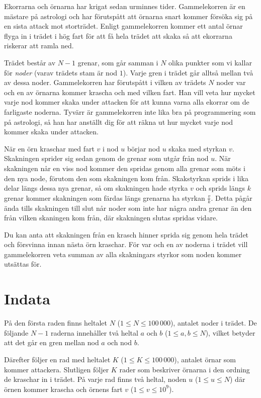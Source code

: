 Ekorrarna och örnarna har krigat sedan urminnes tider.
Gammelekorren är en mästare på astrologi och har förutspått att örnarna snart kommer försöka sig på en sista attack mot storträdet.
Enligt gammelekorren kommer ett antal örnar flyga in i trädet i hög fart för att få hela trädet att skaka så att ekorrarna riskerar att ramla ned.

Trädet består av $N - 1$ grenar, som går samman i $N$ olika punkter som vi kallar för \emph{noder} (varav trädets stam är nod $1$).
Varje gren i trädet går alltså mellan två av dessa noder.
Gammelekorren har förutspått i vilken av trädets $N$ noder var och en av örnarna kommer krascha och med vilken fart.
Han vill veta hur mycket varje nod kommer skaka under attacken för att kunna varna alla ekorrar om de farligaste noderna.
Tyvärr är gammelekorren inte lika bra på programmering som på astrologi, så han har anställt dig för att räkna ut hur mycket varje nod kommer skaka under attacken.

När en örn kraschar med fart $v$ i nod $u$ börjar nod $u$ skaka med styrkan $v$.
Skakningen sprider sig sedan genom de grenar som utgår från nod $u$.
När skakningen når en viss nod kommer den spridas genom alla grenar som möts i den nya node, förutom den som skakningen kom från.
Skakstyrkan sprids i lika delar längs dessa nya grenar, så om skakningen hade styrka $v$ och sprids längs $k$ grenar kommer skakningen som färdas längs grenarna ha styrkan $\frac{v}{k}$.
Detta pågår ända tills skakningen till slut når noder som inte har några andra grenar än den från vilken skaningen kom från, där skakningen slutas spridas vidare.

Du kan anta att skakningen från en krasch hinner sprida sig genom hela trädet och försvinna innan nästa örn kraschar.
För var och en av noderna i trädet vill gammelekorren veta summan av alla skakningars styrkor som noden kommer utsättas för.

\section*{Indata}
På den första raden finns heltalet $N$ ($1 \le N \le 100\,000$), antalet noder i trädet.
De följande $N-1$ raderna innehåller två heltal $a$ och $b$ ($1 \le a,b \le N$), vilket betyder att det går en gren mellan nod $a$ och nod $b$.

Därefter följer en rad med heltalet $K$ ($1 \le K \le 100\,000$), antalet örnar som kommer attackera.
Slutligen följer $K$ rader som beskriver örnarna i den ordning de kraschar in i trädet.
På varje rad finns två heltal, noden $u$ ($1 \le u \le N$) där örnen kommer krascha och örnens fart $v$ ($1 \le v \le 10^9$).

